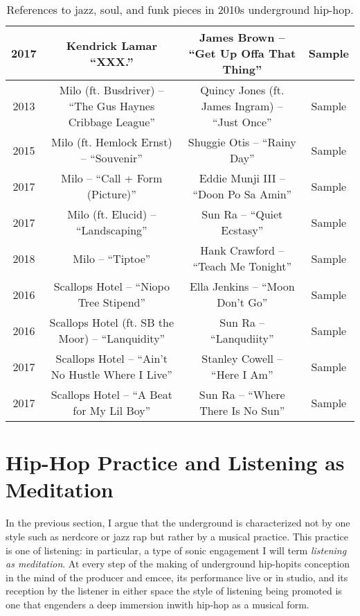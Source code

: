\begin{sidewaystable}[p]
\begin{tabular}{|c|c|c|c|}
        2017 & Kendrick Lamar ``XXX.'' & James Brown -- ``Get Up Offa That Thing'' & Sample \\ \hline
        2013 & Milo (ft. Busdriver) -- ``The Gus Haynes Cribbage League'' & Quincy Jones (ft. James Ingram) -- ``Just Once'' & Sample \\ \hline
        2015 & Milo (ft. Hemlock Ernst) -- ``Souvenir'' & Shuggie Otis -- ``Rainy Day'' & Sample \\ \hline
        2017 & Milo -- ``Call + Form (Picture)'' & Eddie Munji III -- ``Doon Po Sa Amin'' & Sample \\ \hline
        2017 & Milo (ft. Elucid) -- ``Landscaping'' & Sun Ra -- ``Quiet Ecstasy'' & Sample \\ \hline
        2018 & Milo -- ``Tiptoe'' & Hank Crawford -- ``Teach Me Tonight'' & Sample \\ \hline
        2016 & Scallops Hotel -- ``Niopo Tree Stipend'' & Ella Jenkins -- ``Moon Don't Go'' & Sample \\ \hline
        2016 & Scallops Hotel (ft. SB the Moor) -- ``Lanquidity'' & Sun Ra -- ``Lanqudiity'' & Sample \\ \hline
        2017 & Scallops Hotel -- ``Ain't No Hustle Where I Live'' & Stanley Cowell -- ``Here I Am'' & Sample \\ \hline
        2017 & Scallops Hotel -- ``A Beat for My Lil Boy'' & Sun Ra -- ``Where There Is No Sun'' & Sample \\ \hline
    \end{tabular}
    \caption{References to jazz, soul, and funk pieces in 2010s underground hip-hop.}
    \label{tab:jazz_references}
\end{sidewaystable}


\newpage
\section{Hip-Hop Practice and Listening as Meditation}

In the previous section, I argue that the underground is characterized not by one style such as
nerdcore or jazz rap but rather by a musical practice. This practice is one of listening: in 
particular, a type of sonic engagement I will term \emph{listening as meditation}. At every step 
of the making of underground hip-hop\textemdash its conception in the mind of the producer and 
emcee, its performance live or in studio, and its reception by the listener in either space\textemdash 
the style of listening being promoted is one that engenders a deep immersion inwith hip-hop as 
a musical form.

